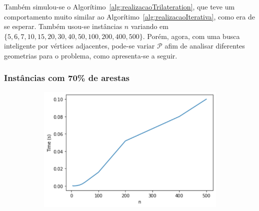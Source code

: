 \documentclass[a4paper,12pt]{article}
\begin{document}
	Também simulou-se o Algorítimo~\ref{alg:realizacaoTrilateration}, que teve um comportamento muito similar ao Algorítimo~\ref{alg:realizacaoIterativa}, como era de se esperar. Também usou-se instâncias $n$ variando em $\{5, 6, 7,10,15,20,30,40,50,100,200,400,500\}$. Porém, agora, com uma busca inteligente por vértices adjacentes, pode-se variar $\mathcal{P}$ afim de analisar diferentes geometrias para o problema, como apresenta-se a seguir.
	
	\subsubsection*{Instâncias com 70\% de arestas}
	
	\begin{figure}[H]
		\begin{center}
			\begin{minipage}{0.45 \linewidth}
				\begin{figure}[H]
					\begin{center}
						\includegraphics[width=1\linewidth]{figures/timeTriPro1.png}
					\end{center}
				\end{figure}
			\end{minipage}
			\hspace{0.1cm}
			\begin{minipage}{0.45 \linewidth}
				

\end{minipage}
\end{center}
\end{figure}
\end{document}
